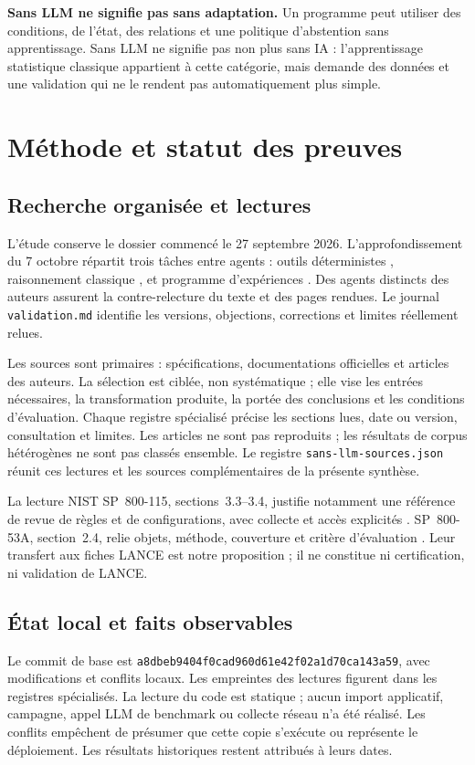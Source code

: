 \documentclass[11pt,a4paper]{article}
\newcommand{\code}[1]{\nolinkurl{#1}}
\begin{document}
\textbf{Sans LLM ne signifie pas sans adaptation.} Un programme peut utiliser
des conditions, de l'état, des relations et une politique d'abstention sans
apprentissage. Sans LLM ne signifie pas non plus sans IA : l'apprentissage
statistique classique appartient à cette catégorie, mais demande des données
et une validation qui ne le rendent pas automatiquement plus simple.

\section{Méthode et statut des preuves}
\subsection{Recherche organisée et lectures}
L'étude conserve le dossier commencé le 27 septembre 2026. L'approfondissement
du 7 octobre répartit trois tâches entre agents : outils déterministes
\cite{outils}, raisonnement classique \cite{raisonnement}, et programme
d'expériences \cite{experiences}. Des agents distincts des auteurs assurent la
contre-relecture du texte et des pages rendues. Le journal \code{validation.md}
identifie les versions, objections, corrections et limites réellement relues.

Les sources sont primaires : spécifications, documentations officielles et
articles des auteurs. La sélection est ciblée, non systématique ; elle vise les
entrées nécessaires, la transformation produite, la portée des conclusions et
les conditions d'évaluation. Chaque registre spécialisé précise les sections
lues, date ou version, consultation et limites. Les articles ne sont pas
reproduits ; les résultats de corpus hétérogènes ne sont pas classés ensemble.
Le registre \code{sans-llm-sources.json} réunit ces lectures et les sources
complémentaires de la présente synthèse.

La lecture NIST SP~800-115, sections~3.3--3.4, justifie notamment une référence
de revue de règles et de configurations, avec collecte et accès explicités
\cite{nist115}. SP~800-53A, section~2.4, relie objets, méthode, couverture et
critère d'évaluation \cite{nist53a}. Leur transfert aux fiches LANCE est notre
proposition ; il ne constitue ni certification, ni validation de LANCE.

\subsection{État local et faits observables}
Le commit de base est \code{a8dbeb9404f0cad960d61e42f02a1d70ca143a59}, avec
modifications et conflits locaux. Les empreintes des lectures figurent dans
les registres spécialisés. La lecture du code est statique ; aucun import
applicatif, campagne, appel LLM de benchmark ou collecte réseau n'a été réalisé.
Les conflits empêchent de présumer que cette copie s'exécute ou représente le
déploiement. Les résultats historiques restent attribués à leurs dates.
\end{document}

